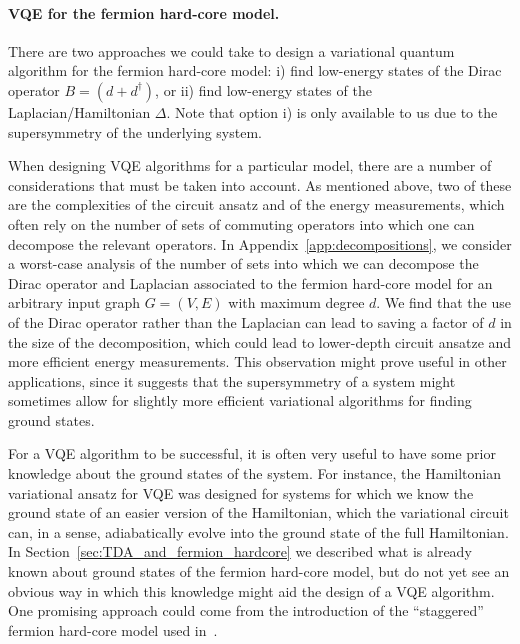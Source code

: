 \documentclass[11pt]{article}
\numberwithin{equation}{section}
\renewcommand\( {\left(}
\renewcommand\) {\right)}
\begin{document}
\paragraph{VQE for the fermion hard-core model.} There are two approaches we could take to design a variational quantum algorithm for the fermion hard-core model: i) find low-energy states of the Dirac operator $B = (d+d^\dagger)$, or ii) find low-energy states of the Laplacian/Hamiltonian $\Delta$. Note that option i) is only available to us due to the supersymmetry of the underlying system.

When designing VQE algorithms for a particular model, there are a number of considerations that must be taken into account. As mentioned above, two of these are the complexities of the circuit ansatz and of the energy measurements, which often rely on the number of sets of commuting operators into which one can decompose the relevant operators. In Appendix~\ref{app:decompositions}, we consider a worst-case analysis of the number of sets into which we can decompose the Dirac operator and Laplacian associated to the fermion hard-core model for an arbitrary input graph $G=(V,E)$ with maximum degree $d$. We find that the use of the Dirac operator rather than the Laplacian can lead to saving a factor of $d$ in the size of the decomposition, which could lead to lower-depth circuit ansatze and more efficient energy measurements. This observation might prove useful in other applications, since it suggests that the supersymmetry of a system might sometimes allow for slightly more efficient variational algorithms for finding ground states.

For a VQE algorithm to be successful, it is often very useful to have some prior knowledge about the ground states of the system. For instance, the Hamiltonian variational ansatz for VQE was designed for systems for which we know the ground state of an easier version of the Hamiltonian, which the variational circuit can, in a sense, adiabatically evolve into the ground state of the full Hamiltonian. In Section~\ref{sec:TDA_and_fermion_hardcore} we described what is already known about ground states of the fermion hard-core model, but do not yet see an obvious way in which this knowledge might aid the design of a VQE algorithm. One promising approach could come from the introduction of the ``staggered'' fermion hard-core model used in~\cite{Fendley_2010,Huijse_2011}. 


\
\end{document}
